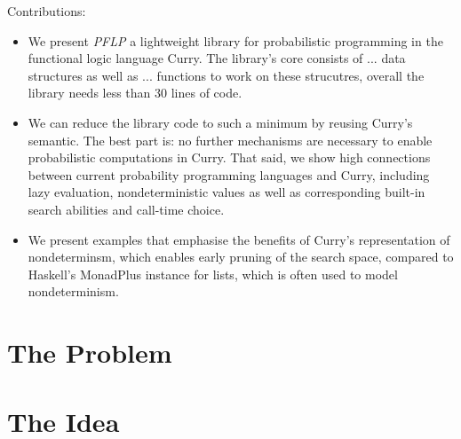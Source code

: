 \documentclass[
12pt, %
a4paper, %
oneside, %
]{llncs}
\begin{document}
Contributions:
\begin{itemize}
\item We present \emph{PFLP} a lightweight library for probabilistic
  programming in the functional logic language Curry. %
  The library's core consists of ... data structures as well as
  ... functions to work on these strucutres, overall the library needs
  less than 30 lines of code. %
\item We can reduce the library code to such a minimum by reusing Curry's
  semantic. %
  The best part is: no further mechanisms are necessary to enable
  probabilistic computations in Curry. %
  That said, we show high connections between current probability
  programming languages and Curry, including lazy evaluation,
  nondeterministic values as well as corresponding built-in search
  abilities and call-time choice. %
\item We present examples that emphasise the benefits of Curry's
  representation of nondeterminsm, which enables early pruning of the
  search space, compared to Haskell's MonadPlus instance for lists,
  which is often used to model nondeterminism. %
\end{itemize}

\section{The Problem}


\section{The Idea}
\end{document}
